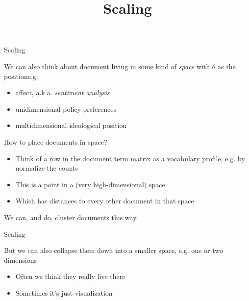 \documentclass{hertieteaching}
\title{Scaling}
\begin{document}
{
\begin{frame}
\maketitle
\end{frame}}
\addtocounter{page}{-1}

\begin{frame}{Scaling}

We can also think about document living in some kind of \textit{space} with $\theta$ as the positione.g.
\begin{itemize}
  \item affect, a.k.a. \textit{sentiment analysis}
  \item unidimensional policy preferences
  \item multidimensional ideological position
\end{itemize}

How to place documents in space?
\begin{itemize}
  \item Think of a row in the document term matrix as a vocabulary profile, e.g. by normalize the counts
  \item This is a point in a (very high-dimensional) space
  \item Which has distances to every other document in that space
\end{itemize}
We can, and do, cluster documents this way.

\end{frame}

\begin{frame}{Scaling}

But we can also collapse them down into a smaller space, e.g. one or two dimensions
\begin{itemize}
  \item Often we think they really live there
  \item Sometimes it's just visualization
\end{itemize}
\end{frame}
\end{document}
